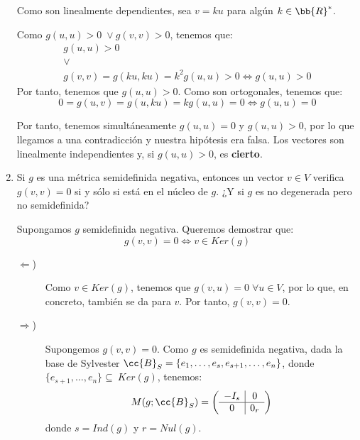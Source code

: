 \begin{ejercicio}
\begin{enumerate}
        Como son linealmente dependientes, sea $v=ku$ para algún $k\in \bb{R}^\ast$.
        
        Como $g(u,u)>0 \;\lor g(v,v)>0$, tenemos que:
        \begin{gather*}
            g(u,u) > 0
            \\ \lor \\
            g(v,v)=g(ku,ku) = k^2g(u,u) >0 \Longleftrightarrow g(u,u) > 0
        \end{gather*}
        Por tanto, tenemos que $g(u,u)>0$. Como son ortogonales, tenemos que:
        \begin{equation*}
            0=g(u,v)=g(u,ku) = kg(u,u) = 0 \Longleftrightarrow g(u,u)=0
        \end{equation*}

        Por tanto, tenemos simultáneamente $g(u,u)=0$ y $g(u,u)>0$, por lo que llegamos a una contradicción y nuestra hipótesis era falsa. Los vectores son linealmente independientes y, si $g(u,u)>0$, es \textbf{cierto}.


        \item Si $g$ es una métrica semidefinida negativa, entonces un vector $v\in V$ verifica $g(v,v)=0$ si y sólo si está en el núcleo de $g$. ¿Y si $g$ es no degenerada pero no semidefinida?

        Supongamos $g$ semidefinida negativa. Queremos demostrar que:
        \begin{equation*}
            g(v,v)=0\Longleftrightarrow v\in Ker(g)
        \end{equation*}
        \begin{description}
            \item [$\Longleftarrow$)] Como $v\in Ker(g)$, tenemos que $g(v,u)=0\;\forall u\in V$, por lo que, en concreto, también se da para $v$. Por tanto, $g(v,v)=0$.

            \item [$\Longrightarrow$)] Supongemos $g(v,v)=0$. Como $g$ es semidefinida negativa, dada la base de Sylvester $\cc{B}_S=\{e_1, \dots, e_s,e_{s+1},\dots, e_n\}$, donde $\{e_{s+1},\dots, e_n\}\subseteq~Ker(g)$,  tenemos:
            \begin{equation*}
                M(g;\cc{B}_S) = \left(\begin{array}{c|c}
                    -I_s & 0 \\ \hline
                    0 & 0_r
                \end{array}\right)
            \end{equation*}
            donde $s=Ind(g)$ y $r=Nul(g)$.


\end{description}
\end{enumerate}
\end{ejercicio}
